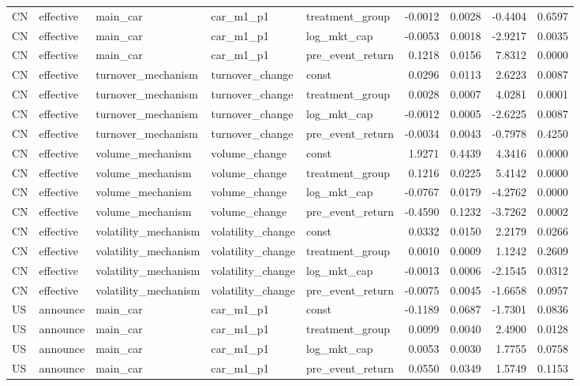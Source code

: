 \begin{tabular}{lllllrrrr}
CN & effective & main_car & car_m1_p1 & treatment_group & -0.0012 & 0.0028 & -0.4404 & 0.6597 \\
CN & effective & main_car & car_m1_p1 & log_mkt_cap & -0.0053 & 0.0018 & -2.9217 & 0.0035 \\
CN & effective & main_car & car_m1_p1 & pre_event_return & 0.1218 & 0.0156 & 7.8312 & 0.0000 \\
CN & effective & turnover_mechanism & turnover_change & const & 0.0296 & 0.0113 & 2.6223 & 0.0087 \\
CN & effective & turnover_mechanism & turnover_change & treatment_group & 0.0028 & 0.0007 & 4.0281 & 0.0001 \\
CN & effective & turnover_mechanism & turnover_change & log_mkt_cap & -0.0012 & 0.0005 & -2.6225 & 0.0087 \\
CN & effective & turnover_mechanism & turnover_change & pre_event_return & -0.0034 & 0.0043 & -0.7978 & 0.4250 \\
CN & effective & volume_mechanism & volume_change & const & 1.9271 & 0.4439 & 4.3416 & 0.0000 \\
CN & effective & volume_mechanism & volume_change & treatment_group & 0.1216 & 0.0225 & 5.4142 & 0.0000 \\
CN & effective & volume_mechanism & volume_change & log_mkt_cap & -0.0767 & 0.0179 & -4.2762 & 0.0000 \\
CN & effective & volume_mechanism & volume_change & pre_event_return & -0.4590 & 0.1232 & -3.7262 & 0.0002 \\
CN & effective & volatility_mechanism & volatility_change & const & 0.0332 & 0.0150 & 2.2179 & 0.0266 \\
CN & effective & volatility_mechanism & volatility_change & treatment_group & 0.0010 & 0.0009 & 1.1242 & 0.2609 \\
CN & effective & volatility_mechanism & volatility_change & log_mkt_cap & -0.0013 & 0.0006 & -2.1545 & 0.0312 \\
CN & effective & volatility_mechanism & volatility_change & pre_event_return & -0.0075 & 0.0045 & -1.6658 & 0.0957 \\
US & announce & main_car & car_m1_p1 & const & -0.1189 & 0.0687 & -1.7301 & 0.0836 \\
US & announce & main_car & car_m1_p1 & treatment_group & 0.0099 & 0.0040 & 2.4900 & 0.0128 \\
US & announce & main_car & car_m1_p1 & log_mkt_cap & 0.0053 & 0.0030 & 1.7755 & 0.0758 \\
US & announce & main_car & car_m1_p1 & pre_event_return & 0.0550 & 0.0349 & 1.5749 & 0.1153 \\

\end{tabular}
